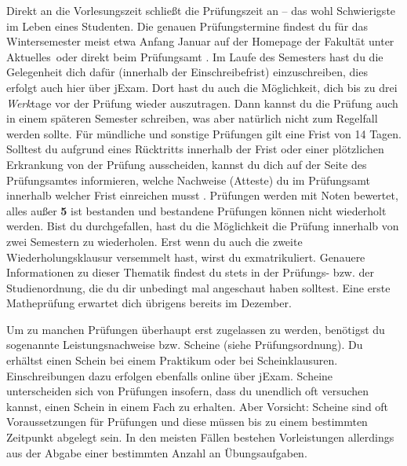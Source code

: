 
Direkt an die Vorlesungszeit schließt die Prüfungszeit an – das wohl Schwierigste im Leben eines Studenten.
Die genauen Prüfungstermine findest du für das Wintersemester meist etwa Anfang Januar auf der Homepage der Fakultät  unter \glqq Aktuelles\grqq\ oder direkt beim Prüfungsamt .
Im Laufe des Semesters hast du die Gelegenheit dich dafür (innerhalb der Einschreibefrist) einzuschreiben, dies erfolgt auch hier über jExam.
Dort hast du auch die Möglichkeit, dich bis zu drei \emph{Werk}tage vor der Prüfung wieder auszutragen. Dann kannst du die Prüfung auch in einem späteren Semester schreiben, was aber natürlich nicht zum Regelfall werden sollte. Für mündliche und sonstige Prüfungen gilt eine Frist von 14 Tagen.
Solltest du aufgrund eines Rücktritts innerhalb der Frist oder einer plötzlichen Erkrankung von der Prüfung ausscheiden, kannst du dich auf der Seite des Prüfungsamtes informieren, welche Nachweise (Atteste) du im Prüfungsamt innerhalb welcher Frist einreichen musst .
Prüfungen werden mit Noten bewertet, alles außer \textbf{5} ist bestanden und bestandene Prüfungen können nicht wiederholt werden.
Bist du durchgefallen, hast du die Möglichkeit die Prüfung innerhalb von zwei Semestern zu wiederholen. Erst wenn du auch die zweite Wiederholungsklausur versemmelt hast, wirst du exmatrikuliert.
Genauere Informationen zu dieser Thematik findest du stets in der Prüfungs- bzw. der Studienordnung, die du dir unbedingt mal angeschaut haben solltest.
Eine erste Matheprüfung erwartet dich übrigens bereits im Dezember.


Um zu manchen Prüfungen überhaupt erst zugelassen zu werden, benötigst du sogenannte Leistungsnachweise bzw. Scheine (siehe Prüfungsordnung).
Du erhältst einen Schein bei einem Praktikum oder bei Scheinklausuren.
Einschreibungen dazu erfolgen ebenfalls online über jExam.
Scheine unterscheiden sich von Prüfungen insofern, dass du unendlich oft versuchen kannst, einen Schein in einem Fach zu erhalten.
Aber Vorsicht: Scheine sind oft Voraussetzungen für Prüfungen und diese müssen bis zu einem bestimmten Zeitpunkt abgelegt sein.
In den meisten Fällen bestehen Vorleistungen allerdings aus der Abgabe einer bestimmten Anzahl an Übungsaufgaben.

\label{sec:sprachausbildung}

